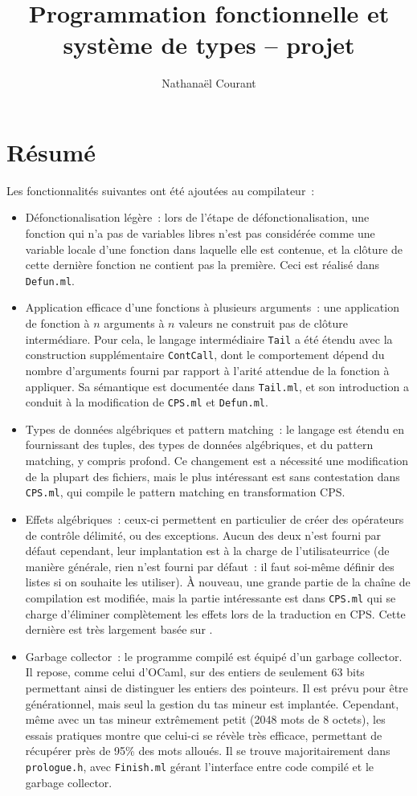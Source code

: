 \documentclass[a4paper,10pt]{article}
\title{Programmation fonctionnelle et système de types -- projet}
\author{Nathanaël Courant}
\begin{document}
\maketitle

\section{Résumé}
Les fonctionnalités suivantes ont été ajoutées au compilateur~:
\begin{itemize}
\item{Défonctionalisation légère~: lors de l'étape de défonctionalisation, une fonction qui n'a pas de variables libres n'est pas considérée comme une variable locale d'une fonction dans laquelle elle est contenue, et la clôture de cette dernière fonction ne contient pas la première. Ceci est réalisé dans \texttt{Defun.ml}.}
\item{Application efficace d'une fonctions à plusieurs arguments~: une application de fonction à $n$ arguments à $n$ valeurs ne construit pas de clôture intermédiare. Pour cela, le langage intermédiaire \texttt{Tail} a été étendu avec la construction supplémentaire \texttt{ContCall}, dont le comportement dépend du nombre d'arguments fourni par rapport à l'arité attendue de la fonction à appliquer. Sa sémantique est documentée dans \texttt{Tail.ml}, et son introduction a conduit à la modification de \texttt{CPS.ml} et \texttt{Defun.ml}.}
\item{Types de données algébriques et pattern matching~: le langage est étendu en fournissant des tuples, des types de données algébriques, et du pattern matching, y compris profond. Ce changement est a nécessité une modification de la plupart des fichiers, mais le plus intéressant est sans contestation dans \texttt{CPS.ml}, qui compile le pattern matching en transformation CPS.}
\item{Effets algébriques~: ceux-ci permettent en particulier de créer des opérateurs de contrôle délimité, ou des exceptions. Aucun des deux n'est fourni par défaut cependant, leur implantation est à la charge de l'utilisat\textperiodcentered{}eur\textperiodcentered{}rice (de manière générale, rien n'est fourni par défaut~: il faut soi-même définir des listes si on souhaite les utiliser). À nouveau, une grande partie de la chaîne de compilation est modifiée, mais la partie intéressante est dans \texttt{CPS.ml} qui se charge d'éliminer complètement les effets lors de la traduction en CPS. Cette dernière est très largement basée sur \cite{hillerstrom2017continuation}.}
\item{Garbage collector~: le programme compilé est équipé d'un garbage collector. Il repose, comme celui d'OCaml, sur des entiers de seulement 63 bits permettant ainsi de distinguer les entiers des pointeurs. Il est prévu pour être générationnel, mais seul la gestion du tas mineur est implantée. Cependant, même avec un tas mineur extrêmement petit (2048 mots de 8 octets), les essais pratiques montre que celui-ci se révèle très efficace, permettant de récupérer près de 95\%{} des mots alloués. Il se trouve majoritairement dans \texttt{prologue.h}, avec \texttt{Finish.ml} gérant l'interface entre code compilé et le garbage collector.}

\end{itemize}
\end{document}
